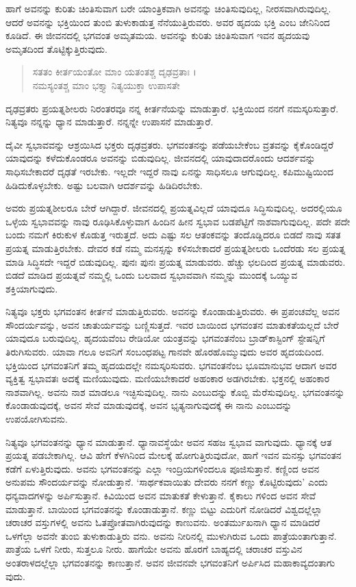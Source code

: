 ಹಾಗೆ ಅವನನ್ನು ಕುರಿತು ಚಿಂತಿಸುವಾಗ ಬರೇ ಯಾಂತ್ರಿಕವಾಗಿ ಅವನನ್ನು ಚಿಂತಿಸುವುದಿಲ್ಲ, ನೀರಸವಾಗಿರುವುದಿಲ್ಲ. ಆದರೆ ಅವನನ್ನು ಭಕ್ತಿಯಿಂದ ತುಂಬಿ ತುಳುಕಾಡುತ್ತ ನೆನೆಯುತ್ತಿರುವರು. ಅವರ ಹೃದಯ ಭಕ್ತಿ ಎಂಬ ಜೇನಿನಿಂದ ಕೂಡಿದೆ. ಈ ಜೀವನದಲ್ಲಿ ಭಗವಂತ ಅಮೃತಮಯ. ಅವನನ್ನು ಕುರಿತು ಚಿಂತಿಸುವಾಗ ಇವನ ಹೃದಯವು ಅಮೃತದಿಂದ ತೊಟ್ಟಿಕ್ಕುತ್ತಿರುವುದು.

\begin{verse}
ಸತತಂ ಕೀರ್ತಯಂತೋ ಮಾಂ ಯತಂತಶ್ಚ ದೃಢವ್ರತಾಃ ।\\ನಮಸ್ಯಂತಶ್ಚ ಮಾಂ ಭಕ್ತ್ಯಾ ನಿತ್ಯಯುಕ್ತಾ ಉಪಾಸತೇ 
\end{verse}

{\small ದೃಢವ್ರತರು ಪ್ರಯತ್ನಶೀಲರು ನಿರಂತರವೂ ನನ್ನ ಕೀರ್ತನೆಯನ್ನು ಮಾಡುತ್ತಾರೆ. ಭಕ್ತಿಯಿಂದ ನನಗೆ ನಮಸ್ಕರಿಸುತ್ತಾರೆ. ನಿತ್ಯವೂ ನನ್ನನ್ನು ಧ್ಯಾನ ಮಾಡುತ್ತಾರೆ. ನನ್ನನ್ನೇ ಉಪಾಸನೆ ಮಾಡುತ್ತಾರೆ.}

ದೈವೀ ಸ್ವಭಾವವನ್ನು ಆಶ್ರಯಿಸಿದ ಭಕ್ತರು ದೃಢವ್ರತರು. ಭಗವಂತನನ್ನು ಪಡೆಯಬೇಕೆಂಬ ವ್ರತವನ್ನು ಕೈಕೊಂಡಿದ್ದರೆ ಯಾವುದನ್ನು ಕಳೆದುಕೊಂಡರೂ ಅವನನ್ನು ಬಿಡುವುದಿಲ್ಲ. ಜೀವನದಲ್ಲಿ ಯಾವುದಾದರೊಂದು ಆದರ್ಶವನ್ನು ಸಾಧಿಸಬೇಕಾದರೆ ದೃಢತೆ ಇರಬೇಕು. ಇಲ್ಲದೇ ಇದ್ದರೆ ನಾವು ಏನನ್ನು ಸಾಧಿಸಲೂ ಆಗುವುದಿಲ್ಲ. ಕಪಿಮುಷ್ಟಿಯಿಂದ ಹಿಡಿದುಕೊಳ್ಳಬೇಕು. ಅಷ್ಟು ಬಲವಾಗಿ ಆದರ್ಶವನ್ನು ಹಿಡಿದಿರಬೇಕು.

ಅವರು ಪ್ರಯತ್ನಶೀಲರೂ ಬೇರೆ ಆಗಿದ್ದಾರೆ. ಜೀವನದಲ್ಲಿ ಪ್ರಯತ್ನವಿಲ್ಲದೆ ಯಾವುದೂ ಸಿದ್ಧಿಸುವುದಿಲ್ಲ. ಅದರಲ್ಲಿಯೂ ಒಳ್ಳೆಯ ಸ್ವಭಾವವನ್ನು ನಾವು ರೂಢಿಸಿಕೊಳ್ಳುವಾಗ ಹಿಂದಿನ ಹೀನ ಸ್ವಭಾವ ಬಡಪೆಟ್ಟಿಗೆ ನಾಶವಾಗುವುದಿಲ್ಲ. ಪದೇ ಪದೇ ಬಂದು ನಮಗೆ ಕಿರುಕುಳ ಕೊಡುತ್ತ ಇರುತ್ತದೆ. ಅದು ಎಷ್ಟು ಸಲ ಆತಂಕವನ್ನು ತಂದೊಡ್ಡಿದರೂ ಬಿಡದೆ ನಾವು ಸತತ ಪ್ರಯತ್ನ ಮಾಡುತ್ತಿರಬೇಕು. ದೇವರ ಕಡೆ ನಮ್ಮ ಮನಸ್ಸನ್ನು ಕಳಿಸಬೇಕಾದರೆ ಪ್ರಯತ್ನಶೀಲರು ಒಂದೆರಡು ಸಲ ಪ್ರಯತ್ನ ಮಾಡಿ ಸಿದ್ಧಿಸದೇ ಇದ್ದರೆ ಬಿಡುವುದಿಲ್ಲ. ಪುನಃ ಪುನಃ ಪ್ರಯತ್ನ ಮಾಡುವರು. ಹೆಚ್ಚು ಛಲದಿಂದ ಪ್ರಯತ್ನ ಮಾಡುವರು. ಬಿಡದೆ ಮಾಡಿದ ಪ್ರಯತ್ನವೆ ನಮ್ಮಲ್ಲಿ ಒಂದು ಬಲವಾದ ಸ್ವಭಾವವಾಗಿ ನಮ್ಮನ್ನು ಮುಂದಕ್ಕೆ ಒಯ್ಯುವ ಶಕ್ತಿಯಾಗುವುದು.

ನಿತ್ಯವೂ ಭಕ್ತರು ಭಗವಂತನ ಕೀರ್ತನೆ ಮಾಡುತ್ತಿರುವರು. ಅವನನ್ನು ಕೊಂಡಾಡುತ್ತಿರುವರು. ಈ ಪ್ರಪಂಚವೆಲ್ಲ ಅವನ ಸೌಂದರ್ಯವನ್ನು, ಅವನ ಚಾತುರ್ಯವನ್ನು ಬಣ್ಣಿಸುತ್ತದೆ. ಇವರ ಬಾಯಿಂದ ಭಗವಂತನ ಮಾತುಕತೆಯಲ್ಲದೆ ಬೇರೆ ಯಾವುದೂ ಬರುವುದಿಲ್ಲ. ಹೃದಯವೆಂಬ ರೇಡಿಯೋ ಯಂತ್ರವನ್ನು ಭಗವಂತನೆಂಬ ಬ್ರಾಡ್​ಕಾಸ್ಟಿಂಗ್ ಸ್ಟೇಷನ್ನಿಗೆ ತಿರುಗಿಸುವರು. ಯಾವಾ ಗಲೂ ಅವನಿಗೆ ಸಂಬಂಧಪಟ್ಟ ಗಾನವೇ ಹೊರಹೊಮ್ಮುವುದು ಅವರ ಹೃದಯದಿಂದ. ಭಕ್ತಿಯಿಂದ ಭಗವಂತನಿಗೆ ತಮ್ಮ ಹೃದಯದಲ್ಲೇ ನಮಸ್ಕರಿಸುವರು. ಭಗವಂತನೆಂಬ ಭೂಮಾನುಭವ ಆದಾಗ ಅವರ ವ್ಯಕ್ತಿತ್ವ ಸ್ವಭಾವತಃ ಅದಕ್ಕೆ ಮಣಿಯುವುದು. ಮಣಿಯಬೇಕಾದರೆ ಅಹಂಕಾರ ಅಡಗಿರಬೇಕು. ಭಕ್ತನಲ್ಲಿ ಅಹಂಕಾರ ನಾಶವಾಗಿಲ್ಲ. ಅವನು ನಾಶ ಮಾಡಲೂ ಇಚ್ಛಿಸುವುದಿಲ್ಲ. ನಾನು ಎಂಬುದನ್ನು ಕೊಬ್ಬಿ ಮೆರೆಸುವುದಿಲ್ಲ. ಭಗವಂತನನ್ನು ಕೊಂಡಾಡುವುದಕ್ಕೆ, ಅವನ ಸೇವೆ ಮಾಡುವುದಕ್ಕೆ, ಅವನ ಭೃತ್ಯನಾಗುವುದಕ್ಕೆ ಈ ನಾನು ಎಂಬುದನ್ನು ಉಪಯೋಗಿಸುವನು.

ನಿತ್ಯವೂ ಭಗವಂತನನ್ನು ಧ್ಯಾನ ಮಾಡುತ್ತಾನೆ. ಧ್ಯಾನಾವಸ್ಥೆಯೇ ಅವನ ಸಹಜ ಸ್ವಭಾವ ವಾಗುವುದು. ಧ್ಯಾನಕ್ಕೆ ಆತ ಪ್ರಯತ್ನ ಪಡಬೇಕಾಗಿಲ್ಲ. ಆವಿ ಹೇಗೆ ಕೆಳಗಿನಿಂದ ಮೇಲಕ್ಕೆ ಹೋಗುತ್ತಿರುವುದೋ, ಹಾಗೆ ಇವನ ಮನಸ್ಸು ಭಗವಂತನ ಕಡೆಗೆ ಏಳುತ್ತಿರುವುದು. ಅವನು ಭಗವಂತನನ್ನು ಎಲ್ಲಾ ಇಂದ್ರಿಯಗಳಿಂದಲೂ ಪೂಜಿಸುತ್ತಾನೆ. ಕಣ್ಣಿಂದ ಅವನ ಅನುಪಮ ಸೌಂದರ್ಯವನ್ನು ನೋಡುತ್ತಾನೆ. ‘ಸಾರ್ಥಕವಾಯಿತು ದೇವರು ನನಗೆ ಕಣ್ಣು ಕೊಟ್ಟಿರುವುದು’ ಎಂದು ಧನ್ಯವಾದಗಳನ್ನು ಅರ್ಪಿಸುತ್ತಾನೆ. ಕಿವಿಯಿಂದ ಅವನ ಮಾತುಕತೆ ಕೇಳುತ್ತಾನೆ. ಕೈಕಾಲು ಗಳಿಂದ ಅವನ ಸೇವೆ ಮಾಡುತ್ತಾನೆ. ಬಾಯಿಂದ ಭಗವಂತನನ್ನು ಕೊಂಡಾಡುತ್ತಾನೆ. ಕಣ್ಣು ಬಿಟ್ಟು ಎದುರಿಗೆ ನೋಡಿದರೆ ವಿಶ್ವದಲ್ಲೆಲ್ಲಾ ಚರಾಚರ ವಸ್ತುಗಳಲ್ಲಿ ಅವನು ಓತಪ್ರೋತವಾಗಿರುವುದನ್ನು ಕಾಣುವನು. ಅಂತರ್ಮುಖನಾಗಿ ಧ್ಯಾನ ಮಾಡಿದರೆ ಒಳಗೆಲ್ಲಾ ಅವನೇ ತುಂಬಿ ತುಳುಕಾಡುತ್ತಿರು ವನು. ಅವನು ನೀರಿನಲ್ಲಿ ಮುಳುಗಿರುವ ಒಂದು ಪಾತ್ರೆಯಂತಾಗುತ್ತಾನೆ. ಪಾತ್ರೆಯ ಒಳಗೆ ನೀರು, ಸುತ್ತಲೂ ನೀರು. ಹಾಗೆಯೇ ಅವನು ಹೊರಗೆ ಬಾಹ್ಯದಲ್ಲಿ ಚರಾಚರ ವಸ್ತುವಿನ ಅಂತರಾಳದಲ್ಲೆಲ್ಲಾ ಭಗವಂತನನ್ನು ಕಾಣುತ್ತಾನೆ. ಅವನ ಜೀವನವೇ ಭಗವಂತನಿಗೆ ಅರ್ಪಿಸಿದ ಮಹಾಕಾವ್ಯದಂತಾಗು ವುದು.

